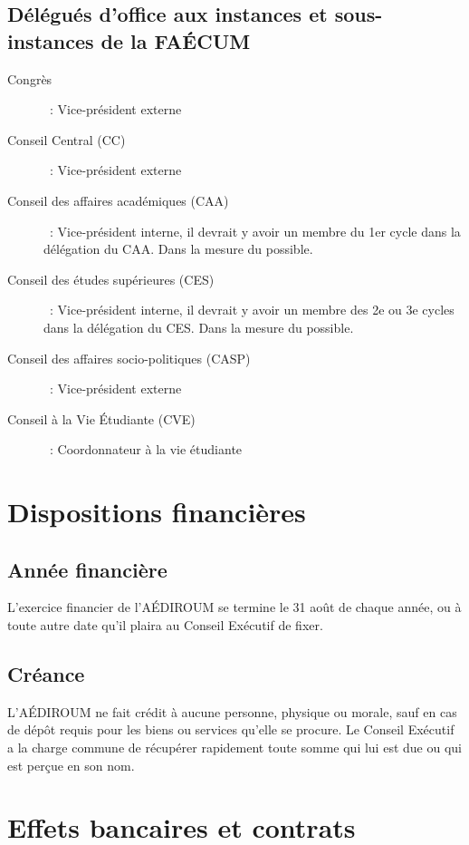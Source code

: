 \documentclass{aediroum}
\begin{document}
\subsection{Délégués d'office aux instances et sous-instances de la FAÉCUM}\label{sec:delegues-doffice-instances}
\begin{description}
\item[Congrès]~: Vice-président externe
\item[Conseil Central (CC)]~: Vice-président externe
\item[Conseil des affaires académiques (CAA)]~: Vice-président interne, il devrait y avoir un membre du 1er cycle dans la délégation du CAA. Dans la mesure du possible.
\item[Conseil des études supérieures (CES)]~: Vice-président interne, il devrait y avoir un membre des 2e ou 3e cycles dans la délégation du CES. Dans la mesure du possible.
\item[Conseil des affaires socio-politiques (CASP)]~: Vice-président externe
\item[Conseil à la Vie Étudiante (CVE)]~: Coordonnateur à la vie étudiante
\end{description}

\section{Dispositions financières}\label{sec:dispositions-financieres}
\subsection{Année financière}\label{sec:annee-financiere}

L'exercice financier de l'AÉDIROUM se termine le 31 août de chaque année, ou à toute autre date qu'il plaira au Conseil Exécutif de fixer.

\subsection{Créance}\label{sec:creance}

L'AÉDIROUM ne fait crédit à aucune personne, physique ou morale, sauf en cas de dépôt requis pour les biens ou services qu'elle se procure. Le Conseil Exécutif a la charge commune de récupérer rapidement toute somme qui lui est due ou qui est perçue en son nom.

\section{Effets bancaires et contrats}\label{sec:effets-bancaires-contrats}
\end{document}
